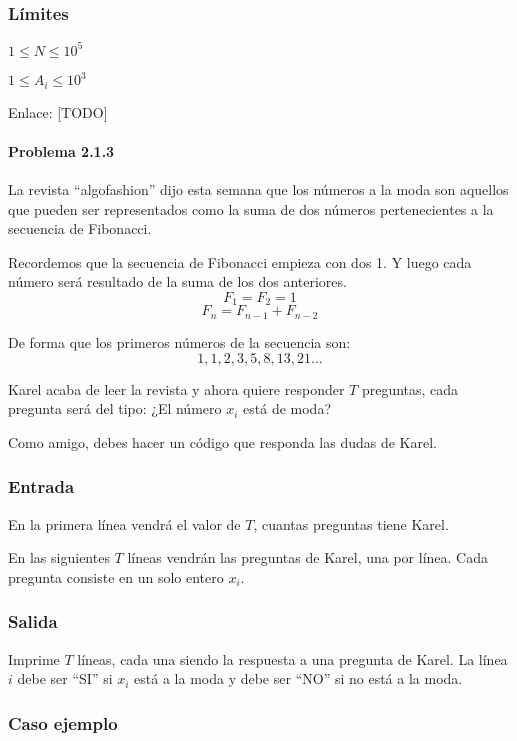 \subsubsection*{Límites}
\begin{plimits}
	\item \(1\leq N \leq 10^5\)
	\item \(1\leq A_i \leq 10^3\)
\end{plimits}

Enlace: [TODO]

\problembreak

\paragraph{Problema 2.1.3} La revista “algofashion” dijo esta semana que los números a la moda son aquellos que pueden ser representados como la suma de dos números pertenecientes a la secuencia de Fibonacci.

Recordemos que la secuencia de Fibonacci empieza con dos 1. Y luego cada número será resultado de la suma de los dos anteriores.
\[F_1=F_2=1\]
\[F_n=F_{n-1}+F_{n-2}\]

De forma que los primeros números de la secuencia son:
 \[1,1,2,3,5,8,13,21\ldots\]

Karel acaba de leer la revista y ahora quiere responder \(T\) preguntas, cada pregunta será del tipo: ¿El número \(x_i\) está de moda?

Como amigo, debes hacer un código que responda las dudas de Karel.

\subsubsection*{Entrada}
En la primera línea vendrá el valor de \(T\), cuantas preguntas tiene Karel.

En las siguientes \(T\) líneas vendrán las preguntas de Karel, una por línea. Cada pregunta consiste en un solo entero \(x_i\).

\subsubsection*{Salida}
Imprime \(T\) líneas, cada una siendo la respuesta a una pregunta de Karel. La línea \(i\) debe ser “SI” si \(x_i\) está a la moda y debe ser “NO” si no está a la moda. 

\subsubsection*{Caso ejemplo}	

